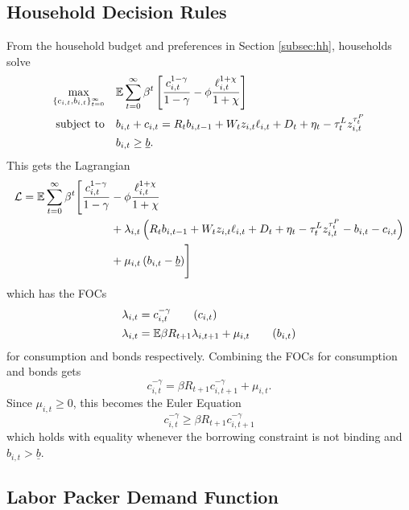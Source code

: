 \subsection{Household Decision Rules}

From the household budget and preferences in Section \ref{subsec:hh}, households solve
\begin{alignat*}{4}
    \max_{\{c_{i, t}, b_{i, t}\}_{t = 0}^\infty} \quad & \mathbb{E} \sum_{t = 0}^\infty \beta^t \left[ \frac{c_{i, t}^{1 - \gamma}}{1 - \gamma} - \phi \frac{\ell_{i, t}^{1 + \chi}}{1 + \chi} \right] \\
    \text{subject to} \quad & b_{i, t} + c_{i, t} = R_t b_{i, t-1} + W_t z_{i, t} \ell_{i, t} + D_t + \eta_t - \tau_t^L z_{i, t}^{\tau_t^P} \\
    & b_{i, t} \geq \underline{b}.
\end{alignat*}
This gets the Lagrangian
\begin{align*}
    \mathcal{L} = \mathbb{E} \sum_{t = 0}^\infty \beta^t \Biggl[ \frac{c_{i, t}^{1 - \gamma}}{1 - \gamma} &- \phi \frac{\ell_{i, t}^{1 + \chi}}{1 + \chi} \\
     &+ \lambda_{i, t} \left( R_t b_{i, t-1} + W_t z_{i, t} \ell_{i, t} + D_t + \eta_t - \tau_t^L z_{i, t}^{\tau_t^P} - b_{i, t} - c_{i, t} \right) \notag \\
     &+ \mu_{i, t} \left(b_{i, t} - \underline{b} \right) \Biggr] \notag
\end{align*}
which has the FOCs
\begin{align*}
    \lambda_{i, t} &= c_{i, t}^{-\gamma} \tag{$c_{i, t}$} \\
    \lambda_{i, t} &= \E \beta R_{t + 1} \lambda_{i, t+1} + \mu_{i, t} \tag{$b_{i, t}$}
\end{align*}
for consumption and bonds respectively. Combining the FOCs for consumption and bonds gets
\begin{equation*}
    c_{i, t}^{-\gamma} = \beta R_{t + 1} c_{i, t + 1}^{-\gamma} + \mu_{i, t}.
\end{equation*}
Since $\mu_{i, t} \geq 0$, this becomes the Euler Equation
\begin{equation*}
    c_{i, t}^{-\gamma} \geq \beta R_{t + 1} c_{i, t + 1}^{-\gamma}
\end{equation*}
which holds with equality whenever the borrowing constraint is not binding and $b_{i, t} > \underline{b}$.


\subsection{Labor Packer Demand Function}

